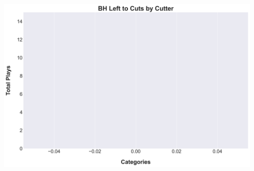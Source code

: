\documentclass[a4paper,12pt]{article}
\begin{document}
\begin{table}[H]
{\begin{minipage}[t]{0.6\textwidth}
{\begin{tabular}
            \bottomrule
        \end{tabular}
        } %
    \end{minipage}
    } %
    \hfill %
    \begin{minipage}[c]{0.35\textwidth} %
        \flushright
        \includegraphics[width=\textwidth, height=.14\textheight]{images/PNR_PassLeftCutsPlayer_Freq.png} %
    \end{minipage}
\end{table}

\vspace{-1em} %
\vspace{-1em} %
\end{document}
